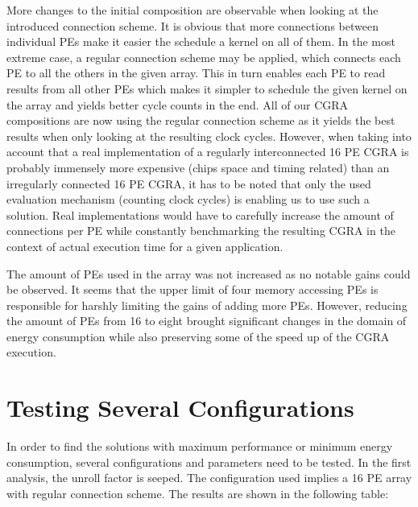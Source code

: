 		More changes to the initial composition are observable when looking at the introduced connection scheme. It is obvious that more connections between individual PEs make it easier the schedule a kernel on all of them. In the most extreme case, a regular connection scheme may be applied, which connects each PE to all the others in the given array. This in turn enables each PE to read results from all other PEs which makes it simpler to schedule the given kernel on the array and yields better cycle counts in the end. All of our CGRA compositions are now using the regular connection scheme as it yields the best results when only looking at the resulting clock cycles. However, when taking into account that a real implementation of a regularly interconnected 16 PE CGRA is probably immensely more expensive (chips space and timing related) than an irregularly connected 16 PE CGRA, it has to be noted that only the used evaluation mechanism (counting clock cycles) is enabling us to use such a solution. Real implementations would have to carefully increase the amount of connections per PE while constantly benchmarking the resulting CGRA in the context of actual execution time for a given application.\newline
		
		The amount of PEs used in the array was not increased as no notable gains could be observed. It seems that the upper limit of four memory accessing PEs is responsible for harshly limiting the gains of adding more PEs. 
		However, reducing the amount of PEs from \num{16} to eight brought significant changes in the domain of energy consumption while also preserving some of the speed up of the CGRA execution.

	\section{Testing Several Configurations} %
	\label{sec:impl_max_perf}
		In order to find the solutions with maximum performance or minimum energy consumption, several configurations and parameters need to be tested. 
		In the first analysis, the unroll factor is seeped. The configuration used implies a 16 PE array with regular connection scheme. The results are shown in the following table:

